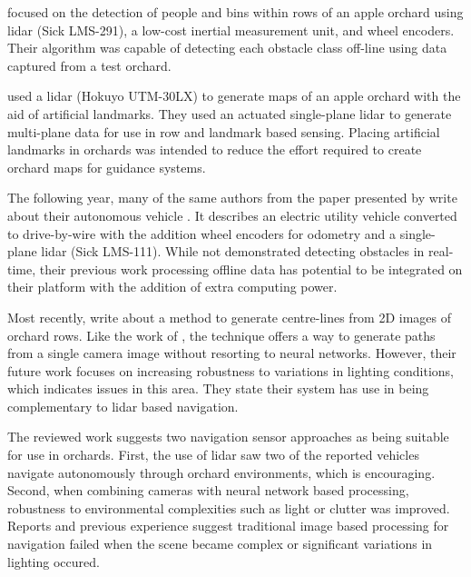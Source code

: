 \documentclass[preprint,authoryear,12pt]{elsarticle}
\begin{document}
        \cite{Freitas2012} focused on the detection of people and bins within rows of an apple orchard using lidar (Sick LMS-291), a low-cost inertial measurement unit, and wheel encoders.
        Their algorithm was capable of detecting each obstacle class off-line using data captured from a test orchard.

        \cite{Zhang2014} used a lidar (Hokuyo UTM-30LX) to generate maps of an apple orchard with the aid of artificial landmarks.
        They used an actuated single-plane lidar to generate multi-plane data for use in row and landmark based sensing.
        Placing artificial landmarks in orchards was intended to reduce the effort required to create orchard maps for guidance systems.

        The following year, many of the same authors from  the paper presented by \cite{Zhang2014} write about their autonomous vehicle \citep{Bergerman2015}.
        It describes an electric utility vehicle converted to drive-by-wire with the addition wheel encoders for odometry and a single-plane lidar (Sick LMS-111).
        While not demonstrated detecting obstacles in real-time, their previous work processing offline data \citep{Freitas2012} has potential to be integrated on their platform with the addition of extra computing power.

        Most recently, \cite{Sharifi2015} write about a method to generate centre-lines from 2D images of orchard rows.
        Like the work of \cite{He2011}, the technique offers a way to generate paths from a single camera image without resorting to neural networks.
        However, their future work focuses on increasing robustness to variations in lighting conditions, which indicates issues in this area.
        They state their system has use in being complementary to lidar based navigation.

        The reviewed work suggests two navigation sensor approaches as being suitable for use in orchards.
        First, the use of lidar saw two of the reported vehicles navigate autonomously through orchard environments, which is encouraging.
        Second, when combining cameras with neural network based processing, robustness to environmental complexities such as light or clutter was improved.
        Reports and previous experience suggest traditional image based processing for navigation failed when the scene became complex or significant variations in lighting occured.
\end{document}

